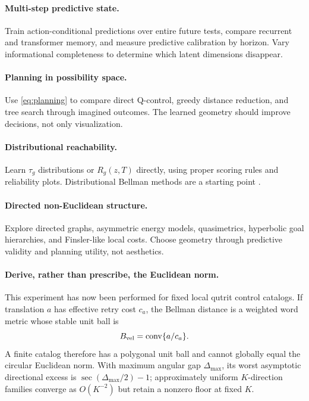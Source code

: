 \documentclass[11pt]{article}
\begin{document}
\paragraph{Multi-step predictive state.}
Train action-conditional predictions over entire future tests, compare
recurrent and transformer memory, and measure predictive calibration by
horizon. Vary informational completeness to determine which latent dimensions
disappear.

\paragraph{Planning in possibility space.}
Use \cref{eq:planning} to compare direct Q-control, greedy distance reduction,
and tree search through imagined outcomes. The learned geometry should improve
decisions, not only visualization.

\paragraph{Distributional reachability.}
Learn $\tau_g$ distributions or $R_g(z,T)$ directly, using proper scoring rules
and reliability plots. Distributional Bellman methods are a starting point
\cite{bellemare2017}.

\paragraph{Directed non-Euclidean structure.}
Explore directed graphs, asymmetric energy models, quasimetrics, hyperbolic
goal hierarchies, and Finsler-like local costs. Choose geometry through
predictive validity and planning utility, not aesthetics.

\paragraph{Derive, rather than prescribe, the Euclidean norm.}
This experiment has now been performed for fixed local qutrit control
catalogs. If translation $a$ has effective retry cost $c_a$, the Bellman
distance is a weighted word metric whose stable unit ball is
\begin{equation}
 B_{\rm vel}=\operatorname{conv}\{a/c_a\}.
 \label{eq:velocity-hull}
\end{equation}
A finite catalog therefore has a polygonal unit ball and cannot globally equal
the circular Euclidean norm. With maximum angular gap $\Delta_{\max}$, its
worst asymptotic directional excess is
$\sec(\Delta_{\max}/2)-1$; approximately uniform $K$-direction families
converge as $O(K^{-2})$ but retain a nonzero floor at fixed $K$.
\end{document}
